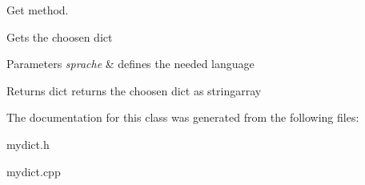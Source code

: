 Get method. 

Gets the choosen dict 
\begin{DoxyParams}{Parameters}
{\em sprache} & defines the needed language \\
\hline
\end{DoxyParams}
\begin{DoxyReturn}{Returns}
dict returns the choosen dict as stringarray 
\end{DoxyReturn}


The documentation for this class was generated from the following files\+:\begin{DoxyCompactItemize}
\item 
mydict.\+h\item 
mydict.\+cpp\end{DoxyCompactItemize}
